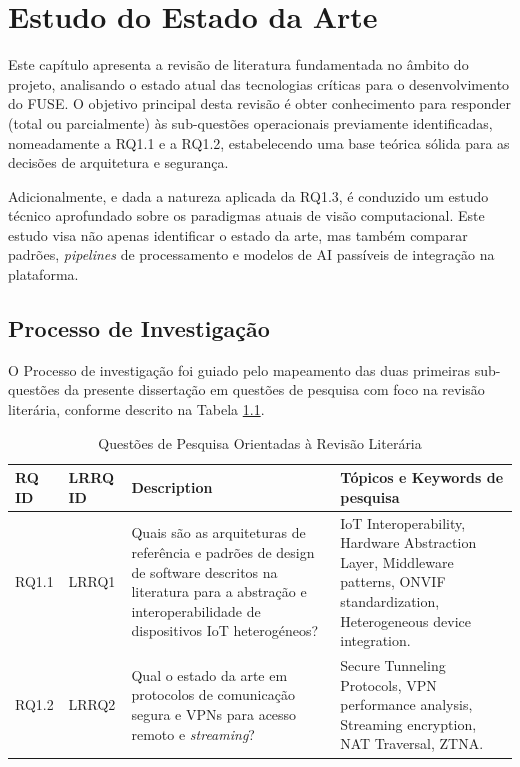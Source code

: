 
\chapter{Estudo do Estado da Arte}
\label{chap:estado_da_arte}

Este capítulo apresenta a revisão de literatura fundamentada no âmbito do projeto, analisando o estado atual das tecnologias críticas para o desenvolvimento do \gls{FUSE}. O objetivo principal desta revisão é obter conhecimento para responder (total ou parcialmente) às sub-questões operacionais previamente identificadas, nomeadamente a RQ1.1 e a RQ1.2, estabelecendo uma base teórica sólida para as decisões de arquitetura e segurança.

Adicionalmente, e dada a natureza aplicada da RQ1.3, é conduzido um estudo técnico aprofundado sobre os paradigmas atuais de visão computacional. Este estudo visa não apenas identificar o estado da arte, mas também comparar padrões, \textit{pipelines} de processamento e modelos de \gls{AI} passíveis de integração na plataforma.

\section{Processo de Investigação}
\label{sec:processo_investigacao}

O Processo de investigação foi guiado pelo mapeamento das duas primeiras sub-questões da presente dissertação em questões de pesquisa com foco na revisão literária, conforme descrito na Tabela \ref{tab:questoes_pesquisa}.

\begin{table}[H]
\centering
\caption{Questões de Pesquisa Orientadas à Revisão Literária}
\label{tab:questoes_pesquisa}
\begin{tabular}{llp{5cm}p{5cm}}
\toprule
\textbf{RQ ID} & \textbf{LRRQ ID} & \textbf{Description} & \textbf{Tópicos e Keywords de pesquisa} \\
\midrule
RQ1.1 & LRRQ1 & Quais são as arquiteturas de referência e padrões de design de software descritos na literatura para a abstração e interoperabilidade de dispositivos \gls{IoT} heterogéneos? & \gls{IoT} Interoperability, Hardware Abstraction Layer, Middleware patterns, \gls{ONVIF} standardization, Heterogeneous device integration. \\
RQ1.2 & LRRQ2 & Qual o estado da arte em protocolos de comunicação segura e \glspl{VPN} para acesso remoto e \textit{streaming}? & Secure Tunneling Protocols, \gls{VPN} performance analysis, Streaming encryption, \gls{NAT} Traversal, \gls{ZTNA}. \\
\bottomrule
\end{tabular}
\end{table}

